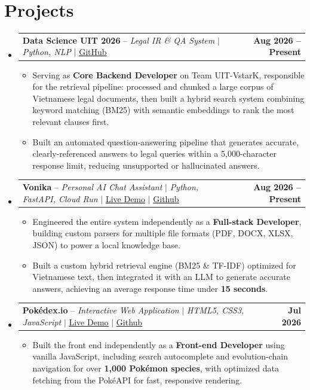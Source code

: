 \documentclass[letterpaper,11pt]{article}
\makeatletter
\newcommand{\resumeItem}[1]{
  \item\small{
    {#1 \vspace{-2pt}}
  }
}
\newcommand{\resumeProjectHeading}[2]{
    \item
    \begin{tabular*}{1.0\textwidth}{l@{\extracolsep{\fill}}r}
      \small#1 & \textbf{#2} \\
    \end{tabular*}\vspace{-7pt}
}
\newcommand{\resumeSubHeadingListStart}{\begin{itemize}[leftmargin=0.0in, label={}]}
\newcommand{\resumeSubHeadingListEnd}{\end{itemize}}
\newcommand{\resumeItemListStart}{\begin{itemize}}
\newcommand{\resumeItemListEnd}{\end{itemize}\vspace{-5pt}}
\makeatother
\begin{document}
\section{Projects}
    \resumeSubHeadingListStart
      \resumeProjectHeading
          {\textbf{Data Science UIT 2026} -- \emph{Legal IR \& QA System} $|$ \emph{Python, NLP} $|$ \href{https://github.com/MtamVP/DSC-UIT-VstarK}{\underline{GitHub}}}{Aug 2026 -- Present}
          \resumeItemListStart
            \resumeItem{Serving as \textbf{Core Backend Developer} on Team UIT-VstarK, responsible for the retrieval pipeline: processed and chunked a large corpus of Vietnamese legal documents, then built a hybrid search system combining keyword matching (BM25) with semantic embeddings to rank the most relevant clauses first.}
            \resumeItem{Built an automated question-answering pipeline that generates accurate, clearly-referenced answers to legal queries within a 5,000-character response limit, reducing unsupported or hallucinated answers.}
          \resumeItemListEnd
          
      \resumeProjectHeading
          {\textbf{Vonika} -- \emph{Personal AI Chat Assistant} $|$ \emph{Python, FastAPI, Cloud Run} $|$ \href{https://vonika.pages.dev/} {\underline{Live Demo}} $|$ \href{https://github.com/MtamVP/Vonika}{\underline{Github}}}{Aug 2026 -- Present}
          \resumeItemListStart
              \resumeItem{Engineered the entire system independently as a \textbf{Full-stack Developer}, building custom parsers for multiple file formats (PDF, DOCX, XLSX, JSON) to power a local knowledge base.}
              \resumeItem{Built a custom hybrid retrieval engine (BM25 \& TF-IDF) optimized for Vietnamese text, then integrated it with an LLM to generate accurate answers, achieving an average response time under \textbf{15 seconds}.}
            \resumeItemListEnd

          
      \resumeProjectHeading
          {\textbf{Pokédex.io} -- \emph{Interactive Web Application} $|$ \emph{HTML5, CSS3, JavaScript} $|$ \href{https://pokedex-vn.pages.dev/}{\underline{Live Demo}} $|$ \href{https://github.com/MtamVP/Pokedex}{\underline{Github}}}{Jul 2026}
          \resumeItemListStart
            \resumeItem{Built the front end independently as a \textbf{Front-end Developer} using vanilla JavaScript, including search autocomplete and evolution-chain navigation for over \textbf{1,000 Pokémon species}, with optimized data fetching from the PokéAPI for fast, responsive rendering.}
          \resumeItemListEnd
    \resumeSubHeadingListEnd
\end{document}
